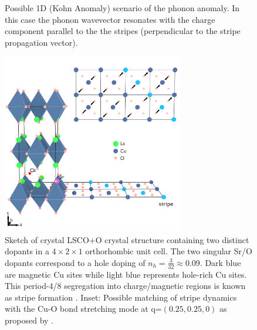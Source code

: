 \begin{figure}
    \centering
    
    \caption[1D phonon anomaly sketch]{Possible 1D (Kohn Anomaly) scenario of the phonon anomaly. In this case the phonon wavevector resonates with the charge component parallel to the the stripes (perpendicular to the stripe propagation vector).}
    \label{fig:anomaly_2d}
\end{figure}

\begin{figure}
    \centering
    \includegraphics[width=0.7\textwidth]{fig/anomaly/overview.png}
    \caption[Crystal structure annotated with phonon at (0.25,0.25,0) and stripe order]{Sketch of crystal LSCO+O crystal structure containing two distinct dopants in a $4 \times 2 \times 1$ orthorhombic unit cell. The two singular Sr/O dopants correspond to a hole doping of $n_h = \frac{3}{32} \approx 0.09$. Dark blue are magnetic Cu sites while light blue represents hole-rich Cu sites. This period-4/8 segregation into charge/magnetic regions is known as stripe formation \cite{Tranquada1995}. Inset: Possible matching of stripe dynamics with the Cu-O bond stretching mode at q=$(0.25,0.25,0)$ as proposed by \citeauthor{Kaneshita2002} \cite{Kaneshita2002}.}
    \label{fig:crystal_anomaly}
\end{figure}

